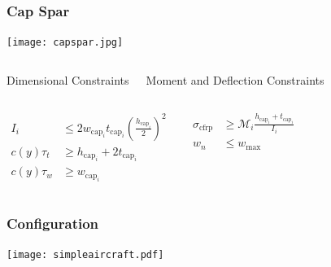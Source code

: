 \documentclass{beamer}
\begin{document}
\begin{frame}
    \frametitle{Cap Spar}

    \begin{center}
    \texttt{[image: capspar.jpg]}
    \end{center}

    \begin{columns}
        \begin{center}
        Dimensional Constraints
        \end{center}
        \begin{center}
        Moment and Deflection Constraints
        \end{center}
    \end{columns}
    
    \begin{columns}
        \begin{align*}
            I_i &\leq 2w_{\text{cap}_i}t_{\text{cap}_i}\left(\frac{h_{\text{cap}_i}}{2}\right)^2 \\
            c(y)\tau_t &\geq h_{\text{cap}_i} + 2t_{\text{cap}_i} \\
            c(y)\tau_w &\geq w_{\text{cap}_i} 
        \end{align*}

        \begin{align*}
            \sigma_{\text{cfrp}} &\geq \mathcal{M}_i \frac{h_{\text{cap}_i}+t_{\text{cap}_i}}{I_i}\\
            w_n &\leq w_{\text{max}}
        \end{align*}
        
    \end{columns}

\end{frame}

\begin{frame}
    \frametitle{Configuration}

    \begin{center}
    \texttt{[image: simpleaircraft.pdf]}
    \end{center}

\end{frame}
\end{document}
